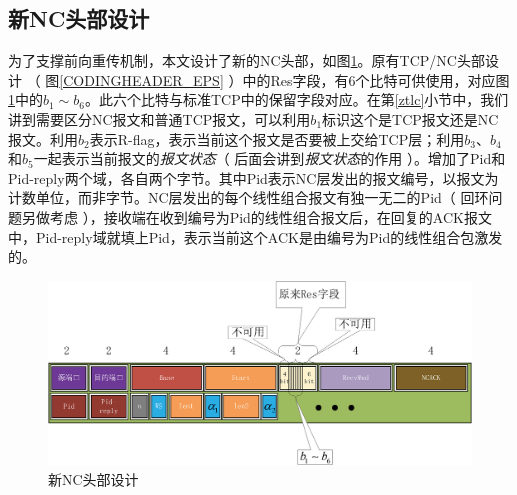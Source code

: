 \subsection{新NC头部设计}
为了支撑前向重传机制，本文设计了新的NC头部，如图\ref{NEWHEADER_EPS}。原有TCP/NC头部设计 （ 图\ref{CODINGHEADER_EPS} ）中的Res字段，有6个比特可供使用，对应图\ref{NEWHEADER_EPS}中的$b_1 \sim b_6$。此六个比特与标准TCP中的保留字段对应。在第\ref{ztlc}小节中，我们讲到需要区分NC报文和普通TCP报文，可以利用$b_1$标识这个是TCP报文还是NC报文。利用$b_2$表示R-flag，表示当前这个报文是否要被上交给TCP层；利用$b_3$、$b_4$和$b_5$一起表示当前报文的\emph{报文状态}（ 后面会讲到\emph{报文状态}的作用 ）。增加了Pid和Pid-reply两个域，各自两个字节。其中Pid表示NC层发出的报文编号，以报文为计数单位，而非字节。NC层发出的每个线性组合报文有独一无二的Pid（ 回环问题另做考虑 ），接收端在收到编号为Pid的线性组合报文后，在回复的ACK报文中，Pid-reply域就填上Pid，表示当前这个ACK是由编号为Pid的线性组合包激发的。
\begin{figure}[htbp]
	\centering
	\includegraphics[width=6in]{figures/newheader.eps}
	\caption{新NC头部设计}
	\label{NEWHEADER_EPS}
\end{figure}
